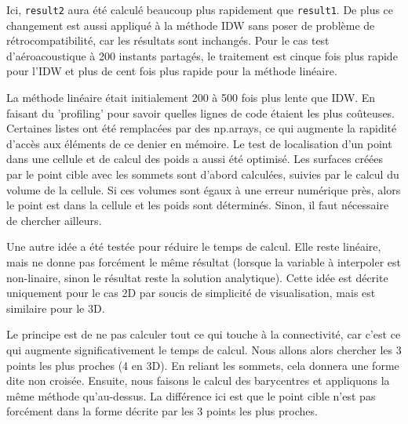 Ici, \texttt{result2} aura été calculé beaucoup plus rapidement que \texttt{result1}. De plus ce changement est aussi appliqué à la méthode IDW sans poser de problème de rétrocompatibilité, car les résultats sont inchangés. Pour le cas test d'aéroacoustique à 200 instants partagés, le traitement est cinque fois plus rapide pour l'IDW et plus de cent fois plus rapide pour la méthode linéaire.


\vspace{0.5cm}

La méthode linéaire était initialement 200 à 500 fois plus lente que IDW. En faisant du 'profiling' pour savoir quelles lignes de code étaient les plus coûteuses. Certaines listes ont été remplacées par des np.arrays, ce qui augmente la rapidité d'accès aux éléments de ce denier en mémoire.
Le test de localisation d'un point dans une cellule et de calcul des poids a aussi été optimisé.
Les surfaces créées par le point cible avec les sommets sont d'abord calculées, suivies par le calcul du volume de la cellule. Si ces volumes sont égaux à une erreur numérique près, alors le point est dans la cellule et les poids sont déterminés. Sinon, il faut nécessaire de chercher ailleurs.

\vspace{0.5cm}

Une autre idée a été testée pour réduire le temps de calcul. Elle reste linéaire, mais ne donne pas forcément le même résultat (lorsque la variable à interpoler est non-linaire, sinon le résultat reste la solution analytique). Cette idée est décrite uniquement pour le cas 2D par soucis de simplicité de visualisation, mais est similaire pour le 3D.

Le principe est de ne pas calculer tout ce qui touche à la connectivité, car c'est ce qui augmente significativement le temps de calcul.
Nous allons alors chercher les 3 points les plus proches (4 en 3D). En reliant les sommets, cela donnera une forme dite non croisée. 
Ensuite, nous faisons le calcul des barycentres et appliquons la même méthode qu'au-dessus.
La différence ici est que le point cible n'est pas forcément dans la forme décrite par les 3 points les plus proches.



